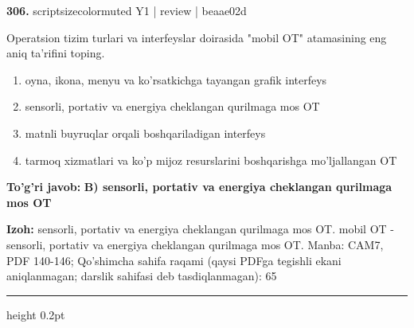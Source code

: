 \documentclass[10pt,a4paper]{article}
\begin{document}
{\bfseries\sffamily\color{ink} 306.} {scriptsizecolor{muted} Y1 | review | beaae02d}
\par
Operatsion tizim turlari va interfeyslar doirasida "mobil OT" atamasining eng aniq ta'rifini toping.
\begin{enumerate}[label=\Alph*),leftmargin=9mm]
\item oyna, ikona, menyu va ko'rsatkichga tayangan grafik interfeys
\item sensorli, portativ va energiya cheklangan qurilmaga mos OT
\item matnli buyruqlar orqali boshqariladigan interfeys
\item tarmoq xizmatlari va ko'p mijoz resurslarini boshqarishga mo'ljallangan OT
\end{enumerate}
\begin{tcolorbox}[enhanced,breakable,colback=teal!4,colframe=teal!60!black,boxrule=0.45pt,arc=1.2mm,left=2.7mm,right=2.7mm,top=1.8mm,bottom=1.8mm,before skip=2mm,after skip=2mm]
{\bfseries\sffamily\color{teal}To'g'ri javob:} \textbf{B) sensorli, portativ va energiya cheklangan qurilmaga mos OT}
\par\smallskip
{\bfseries Izoh:} sensorli, portativ va energiya cheklangan qurilmaga mos OT. mobil OT - sensorli, portativ va energiya cheklangan qurilmaga mos OT. Manba: CAM7, PDF 140-146; Qo'shimcha sahifa raqami (qaysi PDFga tegishli ekani aniqlanmagan; darslik sahifasi deb tasdiqlanmagan): 65
\end{tcolorbox}
\vspace{2mm}\hrule height 0.2pt\vspace{3mm}
\end{document}
